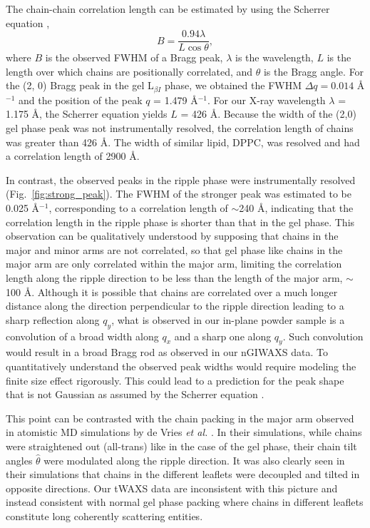 The chain-chain correlation length can be estimated by using the Scherrer equation 
\cite{ref:Warren69},
\[
  B = \frac{0.94\lambda}{L\cos\theta},
\]
where $B$ is the observed FWHM of a Bragg peak, $\lambda$ is the wavelength,
$L$ is the length over which chains are positionally correlated, 
and $\theta$ is the Bragg angle. For the (2, 0) Bragg peak in
the gel L$_{\beta I}$ phase, we obtained the FWHM $\Delta q = 0.014$ \AA$^{-1}$ and
the position of the peak $q$ = 1.479 \AA$^{-1}$. For our X-ray wavelength
$\lambda$ = 1.175 \AA, the Scherrer equation yields $L$ = 426 \AA. 
Because the width of the (2,0) gel phase peak 
was not instrumentally resolved, the correlation length of chains was 
greater than 426 \AA.
The width of similar lipid, DPPC, was resolved and had a correlation 
length of 2900 \AA \cite{ref:Sun94}.

In contrast, the observed peaks in the ripple phase were instrumentally 
resolved (Fig.~\ref{fig:strong_peak}). 
The FWHM of the stronger peak was estimated to be 0.025 \AA$^{-1}$,
corresponding to a correlation length of $\sim$240 \AA,
indicating that the correlation length in the ripple phase is shorter 
than that in the gel phase.
This observation can be qualitatively understood by supposing that chains in the major
and minor arms are not correlated, so that gel phase like chains in the 
major arm are only correlated within the major arm, limiting the correlation
length along the ripple direction to be less than the length of the major 
arm, $\sim$100 \AA. Although
it is possible that chains are correlated over a much longer distance 
along the direction perpendicular to the ripple direction leading to
a sharp reflection along $q_y$,
what is observed in our in-plane powder sample is a convolution
of a broad width along $q_x$ and a sharp one along $q_y$. Such convolution
would result in a broad Bragg rod as observed in our nGIWAXS data.
To quantitatively understand the observed peak widths would require 
modeling the finite size effect rigorously. This could lead to a prediction
for the peak shape that is not Gaussian as assumed by the Scherrer equation 
\cite{ref:Warren69}.

This point can be contrasted with the chain packing in the major arm
observed in atomistic MD simulations by de Vries \textit{et al.} \cite{ref:deVries05}.
In their simulations, while chains were straightened out (all-trans) like in 
the case of the gel phase, their chain tilt angles $\hat{\theta}$ were modulated 
along the ripple direction. It was also
clearly seen in their simulations that chains in the different leaflets were 
decoupled and tilted in opposite directions. Our tWAXS data are 
inconsistent with this picture and instead consistent with normal
gel phase packing where chains in different leaflets constitute long coherently
scattering entities.

